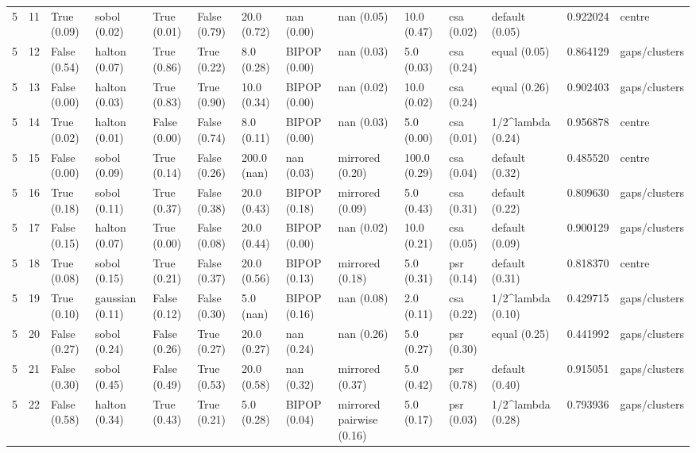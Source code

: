 \begin{tabular}{rlllllllllllrl}
5 & 11 & True (0.09) & sobol (0.02) & True (0.01) & False (0.79) & 20.0 (0.72) & nan (0.00) & nan (0.05) & 10.0 (0.47) & csa (0.02) & default (0.05) & 0.922024 & centre \\
5 & 12 & False (0.54) & halton (0.07) & True (0.86) & True (0.22) & 8.0 (0.28) & BIPOP (0.00) & nan (0.03) & 5.0 (0.03) & csa (0.24) & equal (0.05) & 0.864129 & gaps/clusters \\
5 & 13 & False (0.00) & halton (0.03) & True (0.83) & True (0.90) & 10.0 (0.34) & BIPOP (0.00) & nan (0.02) & 10.0 (0.02) & csa (0.24) & equal (0.26) & 0.902403 & gaps/clusters \\
5 & 14 & True (0.02) & halton (0.01) & False (0.00) & False (0.74) & 8.0 (0.11) & BIPOP (0.00) & nan (0.03) & 5.0 (0.00) & csa (0.01) & 1/2^lambda (0.24) & 0.956878 & centre \\
5 & 15 & False (0.00) & sobol (0.09) & True (0.14) & False (0.26) & 200.0 (nan) & nan (0.03) & mirrored (0.20) & 100.0 (0.29) & csa (0.04) & default (0.32) & 0.485520 & centre \\
5 & 16 & True (0.18) & sobol (0.11) & True (0.37) & False (0.38) & 20.0 (0.43) & BIPOP (0.18) & mirrored (0.09) & 5.0 (0.43) & csa (0.31) & default (0.22) & 0.809630 & gaps/clusters \\
5 & 17 & False (0.15) & halton (0.07) & True (0.00) & False (0.08) & 20.0 (0.44) & BIPOP (0.00) & nan (0.02) & 10.0 (0.21) & csa (0.05) & default (0.09) & 0.900129 & gaps/clusters \\
5 & 18 & True (0.08) & sobol (0.15) & True (0.21) & False (0.37) & 20.0 (0.56) & BIPOP (0.13) & mirrored (0.18) & 5.0 (0.31) & psr (0.14) & default (0.31) & 0.818370 & centre \\
5 & 19 & True (0.10) & gaussian (0.11) & False (0.12) & False (0.30) & 5.0 (nan) & BIPOP (0.16) & nan (0.08) & 2.0 (0.11) & csa (0.22) & 1/2^lambda (0.10) & 0.429715 & gaps/clusters \\
5 & 20 & False (0.27) & sobol (0.24) & False (0.26) & True (0.27) & 20.0 (0.27) & nan (0.24) & nan (0.26) & 5.0 (0.27) & psr (0.30) & equal (0.25) & 0.441992 & gaps/clusters \\
5 & 21 & False (0.30) & sobol (0.45) & False (0.49) & True (0.53) & 20.0 (0.58) & nan (0.32) & mirrored (0.37) & 5.0 (0.42) & psr (0.78) & default (0.40) & 0.915051 & gaps/clusters \\
5 & 22 & False (0.58) & halton (0.34) & True (0.43) & True (0.21) & 5.0 (0.28) & BIPOP (0.04) & mirrored pairwise (0.16) & 5.0 (0.17) & psr (0.03) & 1/2^lambda (0.28) & 0.793936 & gaps/clusters \\

\end{tabular}

